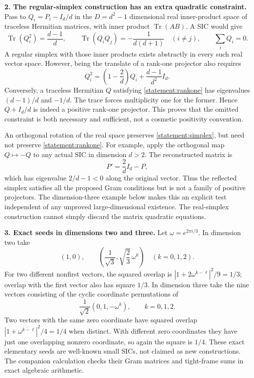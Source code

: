 \documentclass[11pt,a4paper]{article}
\numberwithin{equation}{section}
\begin{document}
\textbf{2. The regular-simplex construction has an extra quadratic constraint.}
Pass to $Q_i=P_i-I_d/d$ in the $D=d^2-1$ dimensional real inner-product
space of traceless Hermitian matrices, with inner product
$\operatorname{Tr}(AB)$. A SIC would give
\begin{equation}\label{statement:simplex}
 \operatorname{Tr}(Q_i^2)=\frac{d-1}{d},\qquad
 \operatorname{Tr}(Q_iQ_j)=-\frac1{d(d+1)}\quad(i\ne j),\qquad
 \sum_iQ_i=0.
\end{equation}
A regular simplex with those inner products exists abstractly in every
such real vector space. However, being the translate of a rank-one
projector also requires
\begin{equation}\label{statement:rankone}
 Q_i^2=\left(1-\frac2d\right)Q_i+\frac{d-1}{d^2}I_d.
\end{equation}
Conversely, a traceless Hermitian $Q$ satisfying
\eqref{statement:rankone} has eigenvalues $(d-1)/d$ and $-1/d$.
The trace forces multiplicity one for the former. Hence $Q+I_d/d$ is
indeed a positive rank-one projector. This proves that the omitted
constraint is both necessary and sufficient, not a cosmetic positivity
convention.

An orthogonal rotation of the real space preserves
\eqref{statement:simplex}, but need not preserve \eqref{statement:rankone}.
For example, apply the orthogonal map $Q\mapsto-Q$ to any actual SIC
in dimension $d>2$. The reconstructed matrix is
\[
 P'=\frac{2}{d}I_d-P,
\]
which has eigenvalue $2/d-1<0$ along the original vector. Thus the
reflected simplex satisfies all the proposed Gram conditions but is
not a family of positive projectors. The dimension-three example below
makes this an explicit test independent of any unproved large-dimensional
existence. The real-simplex construction cannot simply discard the
matrix quadratic equations.

\textbf{3. Exact seeds in dimensions two and three.}
Let $\omega=e^{2\pi i/3}$. In dimension two take
\[
 (1,0),\qquad
 \left(\frac1{\sqrt3},\sqrt{\frac23}\,\omega^k\right)
       \quad(k=0,1,2).
\]
For two different nonfirst vectors, the squared overlap is
$|1+2\omega^{k-\ell}|^2/9=1/3$; overlap with the first vector also
has square $1/3$. In dimension three take the nine vectors consisting
of the cyclic coordinate permutations of
\[
 \frac1{\sqrt2}(0,1,-\omega^k),\qquad k=0,1,2.
\]
Two vectors with the same zero coordinate have squared overlap
$|1+\omega^{k-\ell}|^2/4=1/4$ when distinct. With different zero
coordinates they have just one overlapping nonzero coordinate, so
again the square is $1/4$. These exact elementary seeds are well-known
small SICs, not claimed as new constructions. The companion calculation
checks their Gram matrices and tight-frame sums in exact algebraic
arithmetic.
\end{document}
